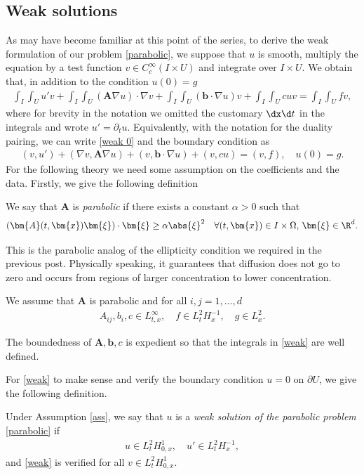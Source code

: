 \documentclass[
    a4paper,
    DIV=14,
    abstract=true,
    numbers=noenddot
]{scrartcl}
\begin{document}
\subsection{Weak solutions}
As may have become familiar at this point of the series, to derive the weak formulation of our problem \eqref{parabolic}, we suppose that $u$ is smooth, multiply the equation by a test function $v \in C_c^\infty(I\times U)$ and integrate over $I\times U$. We obtain that, in addition to the condition $u(0)=g$
\begin{align}\label{weak 0}
  \int_I \int_U u' v + \int_I \int_U (\bm{A} \nabla u) \cdot \nabla v + \int_I \int_U (\bm{b} \cdot \nabla u ) v + \int_I \int_U c u v = \int_I \int_U f v,
\end{align}
where for brevity in the notation we omitted the customary $\dx \d t$ in the integrals and wrote $u'= \partial _t u$. Equivalently, with the notation for the duality pairing, we can write \eqref{weak 0} and the boundary condition as
\begin{align}\label{weak}
 (v, u')+ (\nabla v, \bm{A} \nabla u) + ( v, \bm{b}\cdot \nabla u) + (v, cu) = (v, f), \quad u(0) = g.
\end{align}
For the following theory we need some assumption on the coefficients and the data. Firstly, we give the following definition
\begin{definition}
 We say that $\bm{A}$ is \emph{parabolic} if there exists a constant $\alpha>0$ such that
  \begin{align}\label{parabolicity}
 (\bm{A}(t,\bm{x}) \bm{\xi}) \cdot \bm{\xi} \geq \alpha \abs{\xi}^2 \quad \forall (t,\bm{x}) \in I \times \Omega,\, \bm{\xi} \in \R^d.
  \end{align}
\end{definition}
This is the parabolic analog of the ellipticity condition we required in the previous post. Physically speaking, it guarantees that diffusion does not go to zero and occurs from regions of larger concentration to lower concentration.
\begin{assumption}\label{ass}
 We assume that $\bm{A}$ is parabolic and for all $i,j=1,\dots,d$
  \begin{align*}
 A_{ij}, b_i , c \in L^\infty_{t,x}, \quad f \in L^2_t H^{-1}_x, \quad g \in L^2_x.
  \end{align*}
\end{assumption}
The boundedness of $\bm{A},\bm{b},c$ is expedient so that the integrals in \eqref{weak} are well defined.


For \eqref{weak} to make sense and verify the boundary condition $u=0$ on $\partial U$, we give the following definition.
\begin{definition}\label{weak def}
 Under Assumption \ref{ass}, we say that $u$ is a \emph{weak solution of the parabolic problem} \eqref{parabolic} if
  \begin{align*}
 u \in L^2_t H^1_{0,x}, \quad u' \in L^2_t H^{-1}_x,
  \end{align*}
and \eqref{weak} is verified for all $v \in L^2_tH^1_{0,x}$.
\end{definition}
\end{document}
